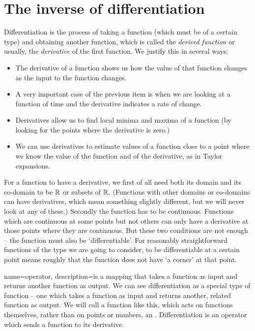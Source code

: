 \chapter{The inverse of differentiation}
Differentiation is the process of taking a function (which must be of a certain type) and obtaining another function, which is called the \emph{derived function} or usually, the \emph{derivative} of the first function. We justify this in several ways:
\begin{itemize}
\item The derivative of a function shows us how the value of that function changes as the input to the function changes. 
\item A very important case of the previous item is when we are looking at a function of time and the derivative indicates a rate of change.
\item Derivatives allow us to find local minima and maxima of a function (by looking for the points where the derivative is zero.)
\item We can use derivatives to estimate values of a function close to a point where we know the value of the function and of the derivative, as in Taylor expansions.
\end{itemize}

For a function to have a derivative, we first of all need both its domain and its co-domain to be $\mathbb{R}$ or subsets of $\mathbb{R}$. (Functions with other domains or co-domains can have derivatives, which mean something slightly different, but we will never look at any of these.) Secondly the function has to be continuous. Functions which are continuous at some points but not others can only have a derivative at those points where they are continuous. But these two conditions are not enough -- the function must also be `differentiable'. For reasonably straightforward functions of the type we are going to consider, to be differentiable at a certain point  means roughly that the function does not have `a corner' at that point.

{
	name=operator,
	description={is a mapping that takes a function as input and returns another function as output.}
}
We can see differentiation as a special type of function -- one which takes a function as input and returns another, related function as output. We will call a function like this, which acts on functions themselves, rather than on points or numbers, an . Differentiation is an operator which sends a function to its derivative. 

